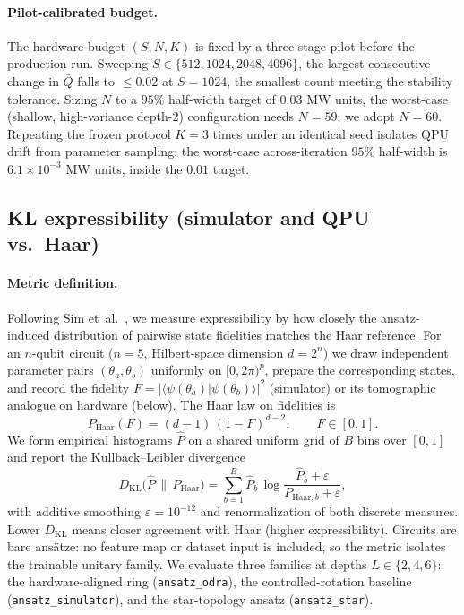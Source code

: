 \documentclass[letterpaper]{article} %
\begin{document}
\paragraph{Pilot-calibrated budget.}
The hardware budget $(S,N,K)$ is fixed by a three-stage pilot before the
production run. Sweeping $S\in\{512,1024,2048,4096\}$, the largest consecutive
change in $\bar Q$ falls to $\le0.02$ at $S=1024$, the smallest count meeting the
stability tolerance. Sizing $N$ to a $95\%$ half-width target of $0.03$ MW units,
the worst-case (shallow, high-variance depth-2) configuration needs $N=59$; we
adopt $N=60$. Repeating the frozen protocol $K=3$ times under an identical seed
isolates QPU drift from parameter sampling; the worst-case across-iteration
$95\%$ half-width is $6.1\times10^{-3}$ MW units, inside the $0.01$ target.


\subsection{KL expressibility (simulator and QPU vs.\ Haar)}

\paragraph{Metric definition.}
Following Sim et~al.~\cite{sim2019}, we measure expressibility by how closely the
ansatz-induced distribution of pairwise state fidelities matches the Haar
reference.
For an $n$-qubit circuit ($n=5$, Hilbert-space dimension $d=2^n$) we draw
independent parameter pairs $(\theta_a,\theta_b)$ uniformly on $[0,2\pi)^{p}$,
prepare the corresponding states, and record the fidelity
$F=|\langle\psi(\theta_a)|\psi(\theta_b)\rangle|^2$ (simulator) or its
tomographic analogue on hardware (below).
The Haar law on fidelities is
\begin{equation}
  P_{\mathrm{Haar}}(F)
  =
  (d-1)\,(1-F)^{d-2},
  \qquad F\in[0,1].
  \label{eq:haar-fidelity}
\end{equation}
We form empirical histograms $\hat P$ on a shared uniform grid of $B$ bins over
$[0,1]$ and report the Kullback--Leibler divergence
\begin{equation}
  D_{\mathrm{KL}}\!\bigl(\hat P\,\big\|\,P_{\mathrm{Haar}}\bigr)
  =
  \sum_{b=1}^{B}
  \hat P_b\,
  \log\!\frac{\hat P_b+\varepsilon}{P_{\mathrm{Haar},b}+\varepsilon},
  \label{eq:kl-expressibility}
\end{equation}
with additive smoothing $\varepsilon=10^{-12}$ and renormalization of both
discrete measures.
Lower $D_{\mathrm{KL}}$ means closer agreement with Haar (higher expressibility).
Circuits are bare ans\"atze: no feature map or dataset input is included, so the
metric isolates the trainable unitary family.
We evaluate three families at depths $L\in\{2,4,6\}$: the hardware-aligned ring
(\texttt{ansatz\_odra}), the controlled-rotation baseline
(\texttt{ansatz\_simulator}), and the star-topology ansatz
(\texttt{ansatz\_star}).
\end{document}
